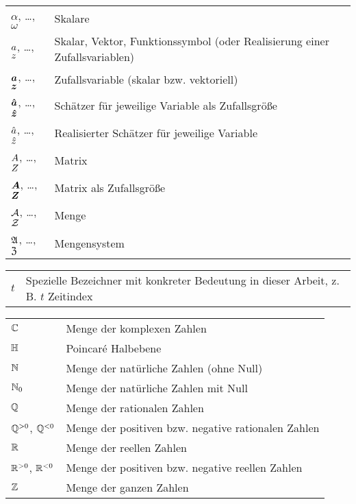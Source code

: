 

\begin{tabular}{p{1.5cm} p{12cm}}
$\alpha$, \dots, $\omega$ & Skalare \\
$a$, \dots, $z$ & Skalar, Vektor, Funktionssymbol (oder Realisierung einer Zufallsvariablen) \\
$\boldsymbol{a}$, \dots, $\boldsymbol{z}$ & Zufallsvariable (skalar bzw. vektoriell) \\
$\boldsymbol{\hat{a}}$, \dots, $\boldsymbol{\hat{z}}$ & Schätzer für jeweilige Variable als Zufallsgröße \\
$\hat{a}$, \dots, $\hat{z}$ & Realisierter Schätzer für jeweilige Variable \\
$A$, \dots, $Z$ & Matrix \\
$\boldsymbol{A}$, \dots, $\boldsymbol{Z}$ & Matrix als Zufallsgröße\\
$\mathcal{A}$, \dots, $\mathcal{Z}$ & Menge \\
$\mathfrak{A}$, \dots, $\mathfrak{Z}$ & Mengensystem \\
\end{tabular}


\begin{tabular}{p{1.5cm} p{12cm}}
$t$ & Spezielle Bezeichner mit konkreter Bedeutung in dieser Arbeit, z.\,B. $t$ Zeitindex\\
\end{tabular}


\begin{tabular}{p{1.5cm} p{12cm}}
$\mathbb{C}$ & Menge der komplexen Zahlen \\
$\mathbb{H}$ & Poincaré Halbebene\\
$\mathbb{N}$ & Menge der natürliche Zahlen (ohne Null) \\
$\mathbb{N}_0$ & Menge der natürliche Zahlen mit Null \\
$\mathbb{Q}$ & Menge der rationalen Zahlen \\
$\mathbb{Q}^{>0}$, $\mathbb{Q}^{<0}$ & Menge der positiven bzw. negative rationalen Zahlen \\
$\mathbb{R}$ & Menge der reellen Zahlen \\
$\mathbb{R}^{>0}$, $\mathbb{R}^{<0}$ & Menge der positiven bzw. negative reellen Zahlen \\
$\mathbb{Z}$ & Menge der ganzen Zahlen \\
\end{tabular}

